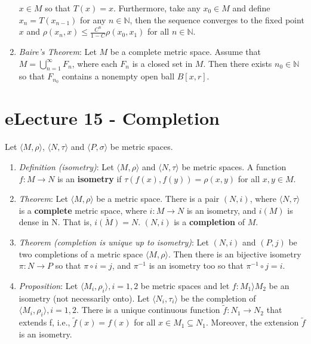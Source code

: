 \message{ !name(cheatsheet.tex)}\documentclass{article}
\begin{document}
\begin{multicols*}{3}
\begin{enumerate}
		      \(x\in M\) so that \(T(x)=x\). Furthermore, take any \(x_0 \in M\) and define
		      \(x_n = T(x_{n-1})\) for any \(n\in\mathbb{N}\), then the sequence converges
		      to the fixed point \(x\) and \(\rho(x_n,x)\leq\frac{C^n}{1-C}\rho(x_0,x_1)\)
		      for all \(n\in\mathbb{N}\).
		\item \emph{Baire's Theorem}: Let \(M\) be a complete metric space. Assume that
		      \(M=\bigcup^\infty_{n=1} F_n\), where each \(F_n\) is a closed set in \(M\).
		      Then there exists \(n_0 \in \mathbb{N}\) so that \(F_{n_0}\) contains a nonempty
		      open ball \(B[x,r]\).
	\end{enumerate}

	\section{eLecture 15 - Completion}
	Let \(\langle M,\rho\rangle\), \(\langle N,\tau\rangle\) and
	\(\langle P,\sigma\rangle\) be metric spaces.
	\begin{enumerate}
		\item \emph{Definition (isometry)}: Let \(\langle M,\rho\rangle\) and \(\langle N,\tau\rangle\)
		      be metric spaces. A function \(f:M\rightarrow N\) is an \textbf{isometry} if
		      \(\tau(f(x),f(y)) = \rho(x,y)\) for all \(x,y\in M\).
		\item \emph{Theorem}: Let \(\langle M,\rho\rangle\) be a metric space. There is a pair
		      \((N,i)\), where \(\langle N,\tau\rangle\) is a \textbf{complete} metric space,
		      where \(i:M\rightarrow N\) is an isometry, and \(i(M)\) is dense in N. That
		      is, \(\overline{i(M)} = N\). \((N,i)\) is a \textbf{completion} of \(M\).
		\item \emph{Theorem (completion is unique up to isometry)}: Let \((N,i)\) and \((P,j)\)
		      be two completions of a metric space \(\langle M,\rho\rangle\). Then there is
		      an bijective isometry \(\pi:N\rightarrow P\) so that \(\pi\circ i = j\), and
		      \(\pi^{-1}\) is an isometry too so that \(\pi^{-1}\circ j = i\).
		\item \emph{Proposition}: Let \(\langle M_i,\rho_i\rangle, i=1,2\) be metric spaces and
		      let \(f:M_1 \rangle M_2\) be an isometry (not necessarily onto). Let
		      \(\langle N_i,\tau_i\rangle\) be the completion of \(\langle
		      M_i,\rho_i\rangle, i=1,2\). There is a unique continuous function
		      \(\widetilde{f}:N_1 \rightarrow N_2\) that extends f, i.e.,
		      \(\widetilde{f}(x)=f(x)\) for all \(x\in M_1\subseteq N_1\). Moreover, the
		      extension \(\widetilde{f}\) is an isometry.
	\end{enumerate}


\end{multicols*}
\end{document}
